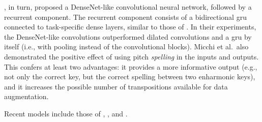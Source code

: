 \textcite{micchi2020not}, in turn, proposed a DenseNet-like
\parencite{huang2017densely} convolutional neural network,
followed by a recurrent component. The recurrent component
consists of a bidirectional \gls{gru}
\parencite{cho2014learning} connected to task-specific dense
layers, similar to those of \textcite{chen2018functional}.
In their experiments, the DenseNet-like convolutions
outperformed dilated convolutions and a \gls{gru} by itself
(i.e., with pooling instead of the convolutional blocks).
Micchi et al.~also demonstrated the positive effect of using
pitch \textit{spelling} in the inputs and outputs. This
confers at least two advantages: it provides a more
informative output (e.g., not only the correct key, but the
correct spelling between two enharmonic keys), and it
increases the possible number of transpositions available
for data augmentation.

Recent models include those of \textcite{micchi2021deep}, \textcite{mcleod2021modular}, and \textcite{napoleslopez2021augmentednet}.

